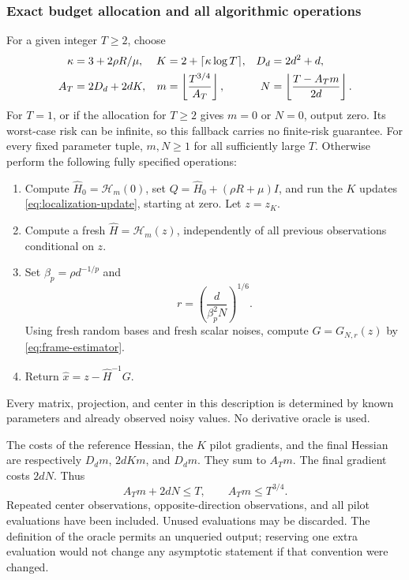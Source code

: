 \documentclass[11pt,a4paper]{article}
\theoremstyle{definition}
\theoremstyle{remark}
\begin{document}
\subsubsection{Exact budget allocation and all algorithmic operations}
For a given integer $T\ge2$, choose
\begin{align}
 \kappa&=3+2\rho R/\mu,
 & K&=2+\lceil\kappa\log T\rceil,
 &D_d&=2d^2+d,\notag\\
 A_T&=2D_d+2dK,
 &m&=\left\lfloor\frac{T^{3/4}}{A_T}\right\rfloor,
 &N&=\left\lfloor\frac{T-A_Tm}{2d}\right\rfloor.
 \label{eq:budget-allocation}
\end{align}
For $T=1$, or if the allocation for $T\ge2$ gives $m=0$ or $N=0$, output zero. Its worst-case risk can be infinite, so this fallback carries no finite-risk guarantee. For every fixed parameter tuple, $m,N\ge1$ for all sufficiently large $T$.
Otherwise perform the following fully specified operations:
\begin{enumerate}
\item Compute $\widehat H_0=\mathcal H_m(0)$, set $Q=\widehat H_0+(\rho R+\mu)I$, and run the $K$ updates \eqref{eq:localization-update}, starting at zero. Let $z=z_K$.
\item Compute a fresh $\widehat H=\mathcal H_m(z)$, independently of all previous observations conditional on $z$.
\item Set $\beta_p=\rho d^{-1/p}$ and
\begin{equation}\label{eq:final-radius}
 r=\left(\frac{d}{\beta_p^2N}\right)^{1/6}.
\end{equation}
Using fresh random bases and fresh scalar noises, compute $G=G_{N,r}(z)$ by \eqref{eq:frame-estimator}.
\item Return $\widehat x=z-\widehat H^{-1}G$.
\end{enumerate}
Every matrix, projection, and center in this description is determined by known parameters and already observed noisy values. No derivative oracle is used.

The costs of the reference Hessian, the $K$ pilot gradients, and the final Hessian are respectively $D_dm$, $2dKm$, and $D_dm$. They sum to $A_Tm$. The final gradient costs $2dN$. Thus
\begin{equation}\label{eq:budget-verified}
 A_Tm+2dN\le T,\qquad A_Tm\le T^{3/4}.
\end{equation}
Repeated center observations, opposite-direction observations, and all pilot evaluations have been included. Unused evaluations may be discarded. The definition of the oracle permits an unqueried output; reserving one extra evaluation would not change any asymptotic statement if that convention were changed.
\end{document}
